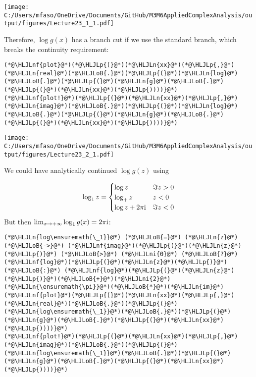 \documentclass[12pt,landscape]{article}
\newcommand{\HLJLn}[1]{#1}
\newcommand{\HLJLnf}[1]{\textcolor[RGB]{66,102,213}{#1}}
\newcommand{\HLJLni}[1]{\textcolor[RGB]{59,151,46}{#1}}
\newcommand{\HLJLoB}[1]{\textcolor[RGB]{102,102,102}{\textbf{#1}}}
\newcommand{\HLJLp}[1]{#1}
\def\I{ {\rm i} }
\begin{document}
{\texttt{[image: C:/Users/mfaso/OneDrive/Documents/GitHub/M3M6AppliedComplexAnalysis/output/figures/Lecture23\_1\_1.pdf]}

Therefore, $\log g(x)$ has a branch cut if we use the standard branch, which breaks the continuity requirement:


\begin{lstlisting}
(*@\HLJLnf{plot}@*)(*@\HLJLp{(}@*)(*@\HLJLn{xx}@*)(*@\HLJLp{,}@*) (*@\HLJLn{real}@*)(*@\HLJLoB{.}@*)(*@\HLJLp{(}@*)(*@\HLJLn{log}@*)(*@\HLJLoB{.}@*)(*@\HLJLp{(}@*)(*@\HLJLn{g}@*)(*@\HLJLoB{.}@*)(*@\HLJLp{(}@*)(*@\HLJLn{xx}@*)(*@\HLJLp{))))}@*)
(*@\HLJLnf{plot!}@*)(*@\HLJLp{(}@*)(*@\HLJLn{xx}@*)(*@\HLJLp{,}@*) (*@\HLJLn{imag}@*)(*@\HLJLoB{.}@*)(*@\HLJLp{(}@*)(*@\HLJLn{log}@*)(*@\HLJLoB{.}@*)(*@\HLJLp{(}@*)(*@\HLJLn{g}@*)(*@\HLJLoB{.}@*)(*@\HLJLp{(}@*)(*@\HLJLn{xx}@*)(*@\HLJLp{))))}@*)
\end{lstlisting}

\texttt{[image: C:/Users/mfaso/OneDrive/Documents/GitHub/M3M6AppliedComplexAnalysis/output/figures/Lecture23\_2\_1.pdf]}

We could have analytically continued $\log g(z)$ using

\[
\log_1 z = \begin{cases} \log z & \Im z > 0 \\
                            \log_+ z & z < 0 \\
                            \log z + 2\pi \I & \Im z < 0
                            \end{cases}
\]
But then $\lim_{x\rightarrow + \infty} \log_1 g(x) = 2 \pi \I$:


\begin{lstlisting}
(*@\HLJLn{log\ensuremath{\_1}}@*) (*@\HLJLoB{=}@*) (*@\HLJLn{z}@*) (*@\HLJLoB{->}@*) (*@\HLJLnf{imag}@*)(*@\HLJLp{(}@*)(*@\HLJLn{z}@*)(*@\HLJLp{)}@*) (*@\HLJLoB{>}@*) (*@\HLJLni{0}@*) (*@\HLJLoB{?}@*) (*@\HLJLnf{log}@*)(*@\HLJLp{(}@*)(*@\HLJLn{z}@*)(*@\HLJLp{)}@*) (*@\HLJLoB{:}@*) (*@\HLJLnf{log}@*)(*@\HLJLp{(}@*)(*@\HLJLn{z}@*)(*@\HLJLp{)}@*)(*@\HLJLoB{+}@*)(*@\HLJLni{2}@*)(*@\HLJLn{\ensuremath{\pi}}@*)(*@\HLJLoB{*}@*)(*@\HLJLn{im}@*)
(*@\HLJLnf{plot}@*)(*@\HLJLp{(}@*)(*@\HLJLn{xx}@*)(*@\HLJLp{,}@*) (*@\HLJLn{real}@*)(*@\HLJLoB{.}@*)(*@\HLJLp{(}@*)(*@\HLJLn{log\ensuremath{\_1}}@*)(*@\HLJLoB{.}@*)(*@\HLJLp{(}@*)(*@\HLJLn{g}@*)(*@\HLJLoB{.}@*)(*@\HLJLp{(}@*)(*@\HLJLn{xx}@*)(*@\HLJLp{))))}@*)
(*@\HLJLnf{plot!}@*)(*@\HLJLp{(}@*)(*@\HLJLn{xx}@*)(*@\HLJLp{,}@*) (*@\HLJLn{imag}@*)(*@\HLJLoB{.}@*)(*@\HLJLp{(}@*)(*@\HLJLn{log\ensuremath{\_1}}@*)(*@\HLJLoB{.}@*)(*@\HLJLp{(}@*)(*@\HLJLn{g}@*)(*@\HLJLoB{.}@*)(*@\HLJLp{(}@*)(*@\HLJLn{xx}@*)(*@\HLJLp{))))}@*)
\end{lstlisting}

}
\end{document}
